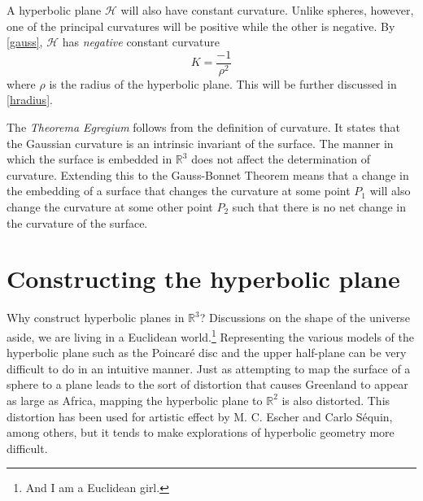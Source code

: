 \documentclass[letterpaper,titlepage]{article}
\newcommand{\esp}{$\mathbb{R}^3$}
\begin{document}
A hyperbolic plane $\mathcal{H}$ will also have constant curvature.
Unlike spheres, however, one of the principal curvatures will be positive while the other is negative.
By \eqref{gauss}, $\mathcal{H}$ has \emph{negative} constant curvature
\begin{equation}
K = \frac{-1}{\rho^2}
\label{hcurve}
\end{equation}
where $\rho$ is the radius of the hyperbolic plane. This will be further discussed in \ref{hradius}.

The \emph{Theorema Egregium} follows from the definition of curvature.
It states that the Gaussian curvature is an intrinsic invariant of the surface.\cite{gauss}
The manner in which the surface is embedded in $\mathbb{R}^3$ does not affect the determination of curvature.
Extending this to the Gauss-Bonnet Theorem means that a change in the embedding of a surface that changes the curvature at some point $P_1$ will also change the curvature at some other point $P_2$ such that there is no net change in the curvature of the surface.\cite{makingmath}


\section{Constructing the hyperbolic plane}
Why construct hyperbolic planes in \esp?
Discussions on the shape of the universe aside, we are living in a Euclidean world.\footnote{And I am a Euclidean girl.\cite{madonna}}
Representing the various models of the hyperbolic plane such as the Poincar\'e disc and the upper half-plane can be very difficult to do in an intuitive manner.
Just as attempting to map the surface of a sphere to a plane leads to the sort of distortion that causes Greenland to appear as large as Africa, mapping the hyperbolic plane to $\mathbb{R}^2$ is also distorted.\cite{makingmath}
This distortion has been used for artistic effect by M. C. Escher and Carlo S\'equin, among others, but it tends to make explorations of hyperbolic geometry more difficult.\cite{adventures}
\end{document}

